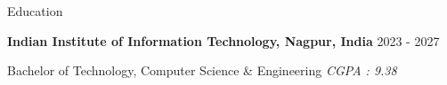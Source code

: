 \documentclass{resume} %
\begin{document}




\begin{rSection}{Education}

{\bf Indian Institute of Information Technology, Nagpur, India} \hfill {2023 - 2027}

 Bachelor of Technology, Computer Science \& Engineering \hfill \textit{CGPA : 9.38}

\end{rSection}

\end{document}
